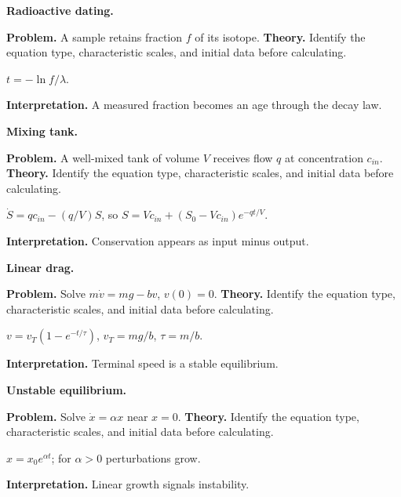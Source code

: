 \begin{workedexample}
\textbf{Radioactive dating.}\par
\textbf{Problem.} A sample retains fraction $f$ of its isotope.
\textbf{Theory.} Identify the equation type, characteristic scales, and initial data before calculating.
\begin{solution}
$t=-\ln f/\lambda$.

\textbf{Interpretation.} A measured fraction becomes an age through the decay law.
\end{solution}
\end{workedexample}

\begin{workedexample}
\textbf{Mixing tank.}\par
\textbf{Problem.} A well-mixed tank of volume $V$ receives flow $q$ at concentration $c_{in}$.
\textbf{Theory.} Identify the equation type, characteristic scales, and initial data before calculating.
\begin{solution}
$\dot S=qc_{in}-(q/V)S$, so $S=Vc_{in}+(S_0-Vc_{in})e^{-qt/V}$.

\textbf{Interpretation.} Conservation appears as input minus output.
\end{solution}
\end{workedexample}

\begin{workedexample}
\textbf{Linear drag.}\par
\textbf{Problem.} Solve $m\dot v=mg-bv$, $v(0)=0$.
\textbf{Theory.} Identify the equation type, characteristic scales, and initial data before calculating.
\begin{solution}
$v=v_T(1-e^{-t/\tau})$, $v_T=mg/b$, $\tau=m/b$.

\textbf{Interpretation.} Terminal speed is a stable equilibrium.
\end{solution}
\end{workedexample}

\begin{workedexample}
\textbf{Unstable equilibrium.}\par
\textbf{Problem.} Solve $\dot x=\alpha x$ near $x=0$.
\textbf{Theory.} Identify the equation type, characteristic scales, and initial data before calculating.
\begin{solution}
$x=x_0e^{\alpha t}$; for $\alpha>0$ perturbations grow.

\textbf{Interpretation.} Linear growth signals instability.
\end{solution}
\end{workedexample}

